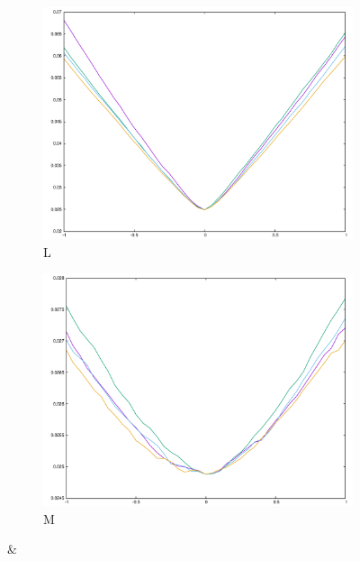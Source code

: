 {\begin{figure}[H]
\begin{subfigure}{.33\textwidth}
\end{subfigure}\\
\begin{subfigure}{.33\textwidth}
	\includegraphics[width=\linewidth]{fig/ajherr/t3t/L_mae.pdf}
	\caption{L}
\end{subfigure}%
\begin{subfigure}{.33\textwidth}
	\includegraphics[width=\linewidth]{fig/ajherr/t3t/M_mae.pdf}
	\caption{M}
\end{subfigure}&
\begin{subfigure}{.33\textwidth}

\end{subfigure}
\end{figure}}
